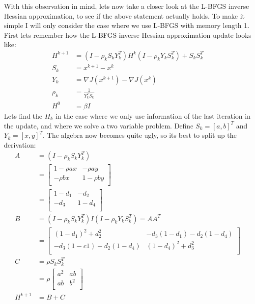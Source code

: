 \documentclass[11pt,a4paper]{article}
\begin{document}
With this observation in mind, lets now take a closer look at the L-BFGS inverse Hessian approximation, to see if the above statement actually holds. To make it simple I will only consider the case where we use L-BFGS with memory length 1. First lets remember how the L-BFGS inverse Hessian approximation update looks like:
\begin{align*}
H^{k+1} &= (I-\rho_kS_kY_k^T)H^k(I-\rho_kY_kS_k^T) + S_kS_k^T\\
S_k &= x^{k+1}-x^{k} \\
Y_k &= \nabla J(x^{k+1})-\nabla J(x^{k})\\
\rho_k &= \frac{1}{Y_k^TS_k} \\
H^0 &= \beta I
\end{align*}
Lets find the $H_k$ in the case where we only use information of the last iteration in the update, and where we solve a two variable problem. Define $S_k=[a,b]^T$ and $Y_k=[x,y]^T$. The algebra now becomes quite ugly, so its best to split up the derivation:
\begin{align*}
A &= (I-\rho_kS_kY_k^T) \\
&=\left[ \begin{array}{cc}
   	1-\rho ax & -\rho ay\\
    	-\rho bx& 1-\rho by\\
   \end{array}  \right] \\
&=\left[ \begin{array}{cc}
   	1-d_1 & -d_2\\
    	-d_3& 1-d_4\\
   \end{array}  \right] \\
B &= (I-\rho_kS_kY_k^T)I(I-\rho_kY_kS_k^T) = AA^T \\
&=\left[ \begin{array}{cc}
   	(1-d_1)^2 + d_2^2& -d_3(1-d_1) -d_2(1-d_4)\\
    	-d_3(1-c1)-d_2(1-d_4)& (1-d_4)^2 +d_3^2\\
   \end{array}  \right] \\
C&= \rho S_kS_k^T \\
&=\rho\left[ \begin{array}{cc}
   	a^2  & ab\\
    	ab& b^2\\
   \end{array}  \right] \\
H^{k+1}&=B+C
\end{align*}
\end{document}
